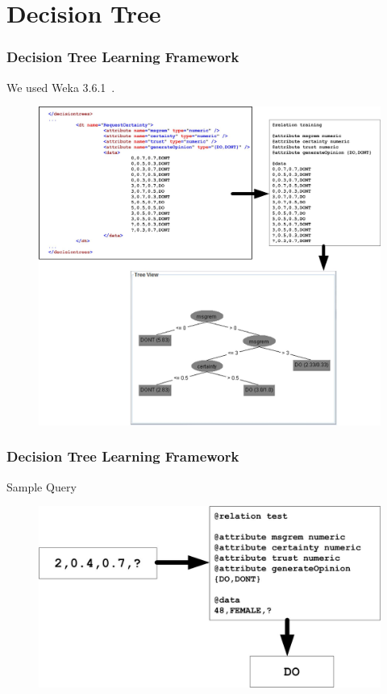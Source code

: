 \section{Decision Tree}
\begin{frame}
\frametitle{Decision Tree Learning Framework}

We used Weka 3.6.1~\citep*{weka}.

\begin{figure}
\centering
\includegraphics[height=0.75\textheight]{../report/images/xml2dtxtra}
\end{figure}

\end{frame}

\begin{frame}
\frametitle{Decision Tree Learning Framework}

Sample Query

\begin{figure}
\centering
\includegraphics[width=1\textwidth]{../report/images/xml2dttest}
\end{figure}

\end{frame}